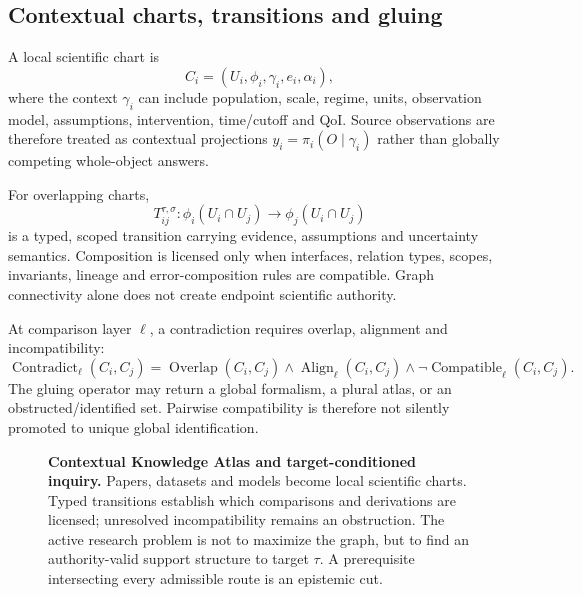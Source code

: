 \documentclass[11pt]{article}
\begin{document}
\subsection{Contextual charts, transitions and gluing}
A local scientific chart is
\begin{equation}
C_i=(U_i,\phi_i,\gamma_i,e_i,\alpha_i),
\end{equation}
where the context $\gamma_i$ can include population, scale, regime, units, observation model, assumptions, intervention, time/cutoff and QoI. Source observations are therefore treated as contextual projections $y_i=\pi_i(O\mid\gamma_i)$ rather than globally competing whole-object answers.

For overlapping charts,
\begin{equation}
T_{ij}^{\tau,\sigma}:\phi_i(U_i\cap U_j)\rightarrow\phi_j(U_i\cap U_j)
\end{equation}
is a typed, scoped transition carrying evidence, assumptions and uncertainty semantics. Composition is licensed only when interfaces, relation types, scopes, invariants, lineage and error-composition rules are compatible. Graph connectivity alone does not create endpoint scientific authority.

At comparison layer $\ell$, a contradiction requires overlap, alignment and incompatibility:
\begin{equation}
\operatorname{Contradict}_{\ell}(C_i,C_j)=\operatorname{Overlap}(C_i,C_j)\land\operatorname{Align}_{\ell}(C_i,C_j)\land\neg\operatorname{Compatible}_{\ell}(C_i,C_j).
\end{equation}
The gluing operator may return a global formalism, a plural atlas, or an obstructed/identified set. Pairwise compatibility is therefore not silently promoted to unique global identification.

\begin{figure}[t]
\centering
\resizebox{0.98\textwidth}{!}{}
\caption{\textbf{Contextual Knowledge Atlas and target-conditioned inquiry.} Papers, datasets and models become local scientific charts. Typed transitions establish which comparisons and derivations are licensed; unresolved incompatibility remains an obstruction. The active research problem is not to maximize the graph, but to find an authority-valid support structure to target $\tau$. A prerequisite intersecting every admissible route is an epistemic cut.}
\label{fig:atlas}
\end{figure}
\end{document}
